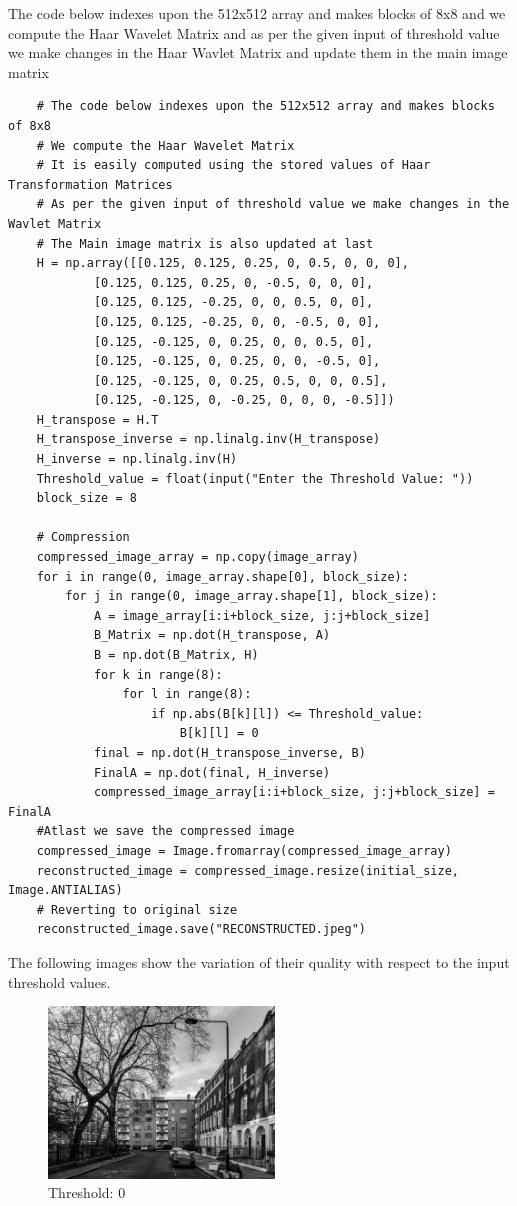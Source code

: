 \documentclass{article}
\begin{document}
The code below indexes upon the 512x512 array and makes blocks of 8x8 and we compute the Haar Wavelet Matrix and as per the given input of threshold value we make changes in the Haar Wavlet Matrix and update them in the main image matrix
\begin{verbatim}
    # The code below indexes upon the 512x512 array and makes blocks of 8x8 
    # We compute the Haar Wavelet Matrix 
    # It is easily computed using the stored values of Haar Transformation Matrices
    # As per the given input of threshold value we make changes in the Wavlet Matrix 
    # The Main image matrix is also updated at last
    H = np.array([[0.125, 0.125, 0.25, 0, 0.5, 0, 0, 0],
            [0.125, 0.125, 0.25, 0, -0.5, 0, 0, 0],
            [0.125, 0.125, -0.25, 0, 0, 0.5, 0, 0],
            [0.125, 0.125, -0.25, 0, 0, -0.5, 0, 0],
            [0.125, -0.125, 0, 0.25, 0, 0, 0.5, 0],
            [0.125, -0.125, 0, 0.25, 0, 0, -0.5, 0],
            [0.125, -0.125, 0, 0.25, 0.5, 0, 0, 0.5],
            [0.125, -0.125, 0, -0.25, 0, 0, 0, -0.5]])
    H_transpose = H.T
    H_transpose_inverse = np.linalg.inv(H_transpose)
    H_inverse = np.linalg.inv(H)
    Threshold_value = float(input("Enter the Threshold Value: "))
    block_size = 8

    # Compression
    compressed_image_array = np.copy(image_array)
    for i in range(0, image_array.shape[0], block_size):
        for j in range(0, image_array.shape[1], block_size):
            A = image_array[i:i+block_size, j:j+block_size]
            B_Matrix = np.dot(H_transpose, A)
            B = np.dot(B_Matrix, H)
            for k in range(8):
                for l in range(8):
                    if np.abs(B[k][l]) <= Threshold_value:
                        B[k][l] = 0
            final = np.dot(H_transpose_inverse, B)
            FinalA = np.dot(final, H_inverse)
            compressed_image_array[i:i+block_size, j:j+block_size] = FinalA
    #Atlast we save the compressed image
    compressed_image = Image.fromarray(compressed_image_array)
    reconstructed_image = compressed_image.resize(initial_size, Image.ANTIALIAS)
    # Reverting to original size
    reconstructed_image.save("RECONSTRUCTED.jpeg")
    \end{verbatim}
The following images show the variation of their quality with respect to the input threshold values.
\begin{figure}[htbp]
    \centering
    \includegraphics[width=6cm]{RECONSTRUCTED0.jpeg}
    \caption{Threshold: 0}
\end{figure}
\end{document}
